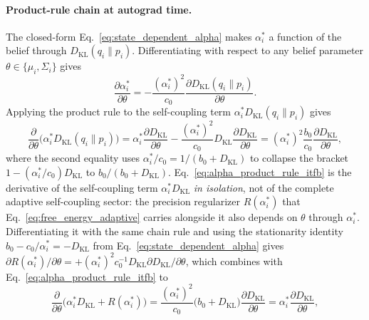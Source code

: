 \documentclass[11pt]{article}
\begin{document}
\paragraph{Product-rule chain at autograd time.}
The closed-form Eq.~\eqref{eq:state_dependent_alpha} makes $\alpha_i^*$ a function of the belief through $D_{\mathrm{KL}}(q_i \| p_i)$. Differentiating with respect to any belief parameter $\theta \in \{\mu_i, \Sigma_i\}$ gives
\begin{equation}
\frac{\partial \alpha_i^*}{\partial \theta} = -\frac{(\alpha_i^*)^2}{c_0} \frac{\partial D_{\mathrm{KL}}(q_i \| p_i)}{\partial \theta}.
\label{eq:alpha_chain_rule_itfb}
\end{equation}
Applying the product rule to the self-coupling term $\alpha_i^* D_{\mathrm{KL}}(q_i \| p_i)$ gives
\begin{equation}
\frac{\partial}{\partial \theta}\bigl(\alpha_i^* D_{\mathrm{KL}}(q_i \| p_i)\bigr) = \alpha_i^* \frac{\partial D_{\mathrm{KL}}}{\partial \theta} - \frac{(\alpha_i^*)^2}{c_0} D_{\mathrm{KL}} \frac{\partial D_{\mathrm{KL}}}{\partial \theta} = (\alpha_i^*)^2 \frac{b_0}{c_0} \frac{\partial D_{\mathrm{KL}}}{\partial \theta},
\label{eq:alpha_product_rule_itfb}
\end{equation}
where the second equality uses $\alpha_i^*/c_0 = 1/(b_0 + D_{\mathrm{KL}})$ to collapse the bracket $1 - (\alpha_i^*/c_0) D_{\mathrm{KL}}$ to $b_0/(b_0 + D_{\mathrm{KL}})$. Eq.~\eqref{eq:alpha_product_rule_itfb} is the derivative of the self-coupling term $\alpha_i^* D_{\mathrm{KL}}$ \emph{in isolation}, not of the complete adaptive self-coupling sector: the precision regularizer $R(\alpha_i^*)$ that Eq.~\eqref{eq:free_energy_adaptive} carries alongside it also depends on $\theta$ through $\alpha_i^*$. Differentiating it with the same chain rule and using the stationarity identity $b_0 - c_0/\alpha_i^* = -D_{\mathrm{KL}}$ from Eq.~\eqref{eq:state_dependent_alpha} gives $\partial R(\alpha_i^*)/\partial\theta = +(\alpha_i^*)^2 c_0^{-1} D_{\mathrm{KL}} \partial D_{\mathrm{KL}}/\partial\theta$, which combines with Eq.~\eqref{eq:alpha_product_rule_itfb} to
\begin{equation}
\frac{\partial}{\partial\theta}\bigl(\alpha_i^* D_{\mathrm{KL}} + R(\alpha_i^*)\bigr) = \frac{(\alpha_i^*)^2}{c_0}\bigl(b_0 + D_{\mathrm{KL}}\bigr)\frac{\partial D_{\mathrm{KL}}}{\partial\theta} = \alpha_i^*\frac{\partial D_{\mathrm{KL}}}{\partial\theta},
\label{eq:alpha_envelope_cancel_itfb}
\end{equation}
\end{document}
